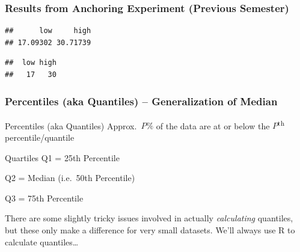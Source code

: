 \begin{frame}[fragile]
  \frametitle{Results from Anchoring Experiment (Previous Semester)}
  \small
\begin{knitrout}
\color{fgcolor}\begin{kframe}
\begin{alltt}
 \hlkwb{<-}  \hlopt{==} \hlstd{)}\hlopt{$}
 \hlkwb{<-}  \hlopt{==} \hlstd{)}\hlopt{$}
\hlstd{(} \hlstd{=}   \hlstd{=} 
\end{alltt}
\begin{verbatim}
##      low     high 
## 17.09302 30.71739
\end{verbatim}
\begin{alltt}
\hlstd{(} \hlstd{=}   \hlstd{=} 
\end{alltt}
\begin{verbatim}
##  low high 
##   17   30
\end{verbatim}
\end{kframe}
\end{knitrout}
\end{frame}

\begin{frame}
\frametitle{Percentiles (aka Quantiles) -- Generalization of Median}
\begin{block}{Percentiles (aka Quantiles)}
Approx.\ $P\%$ of the data are at or below the $P$\textsuperscript{th} percentile/quantile
\end{block}
\pause
\begin{block}{Quartiles}
Q1 = 25th Percentile

Q2 =  Median (i.e.\ 50th Percentile)

Q3 = 75th Percentile
\end{block}


\vspace{1em}
\alert{There are some slightly tricky issues involved in actually \emph{calculating} quantiles, but these only make a difference for very small datasets. We'll always use R to calculate quantiles\dots}

\end{frame}

